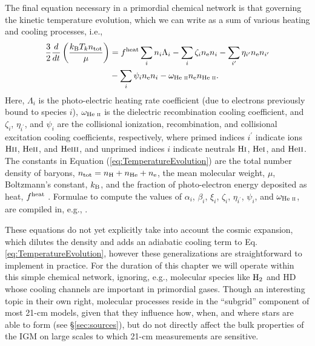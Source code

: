 The final equation necessary in a primordial chemical network is that governing the kinetic temperature evolution, which we can write as a sum of various heating and cooling processes, i.e.,
\begin{align}
    \frac{3}{2}\frac{d}{dt}\left(\frac{k_{\text{B}} T_k n_{\text{tot}}}{\mu}\right) & = f^{\text{heat}}  \sum_i n_i \Lambda_i - \sum_i \zeta_i n_{\text{e}} n_i - \sum_{i^{\prime}} \eta_{i^{\prime}} n_{\text{e}} n_{i^{\prime}} \nonumber \\ & - \sum_i \psi_i n_{\text{e}} n_i - \omega_{\text{He } \textsc{ii}} n_{\text{e}} n_{\text{He } \textsc{ii}} \label{eq:TemperatureEvolution} .
\end{align}
Here, $\Lambda_i$ is the photo-electric heating rate coefficient (due to
electrons previously bound to species $i$), $\omega_{\text{He } \textsc{ii}}$ is the dielectric
recombination cooling coefficient, and $\zeta_i$, $\eta_{i^{\prime}}$, and
$\psi_i$ are the collisional ionization, recombination, and collisional
excitation cooling coefficients, respectively, where primed indices
$i^{\prime}$ indicate ions $\text{H} {\textsc{ii}}$, $\text{He} {\textsc{ii}}$, and $\text{He} {\textsc{iii}}$, and unprimed
indices $i$ indicate neutrals $\text{H} {\textsc{i}}$, $\text{He} {\textsc{i}}$, and $\text{He} {\textsc{ii}}$. The constants in
Equation (\ref{eq:TemperatureEvolution}) are the total number density of
baryons, $n_{\text{tot}} = n_\mathrm{H} + n_{\mathrm{He}} + n_{\text{e}}$, the mean molecular
weight, $\mu$, Boltzmann's constant, $k_{\text{B}}$, and the fraction of photo-electron energy deposited as heat, $f^{\text{heat}}$ \cite{Shull1985,Furlanetto2010}. Formulae to compute the values of
$\alpha_i$, $\beta_i$, $\xi_i$, $\zeta_i$, $\eta_{i^{\prime}}$, $\psi_i$, and
$\omega_{\text{He } \textsc{ii}}$, are compiled in, e.g., \cite{Fukugita1994,Hui1997}.

These equations do not yet explicitly take into account the cosmic expansion, which dilutes the density and adds an adiabatic cooling term to Eq. \ref{eq:TemperatureEvolution}, however these generalizations are straightforward to implement in practice. For the duration of this chapter we will operate within this simple chemical network, ignoring, e.g., molecular species like $\text{H}_2$ and $\mathrm{HD}$ whose cooling channels are important in primordial gases. Though an interesting topic in their own right, molecular processes reside in the ``subgrid'' component of most 21-cm models, given that they influence how, when, and where stars are able to form (see \S\ref{sec:sources}), but do not directly affect the bulk properties of the IGM on large scales to which 21-cm measurements are sensitive. 

